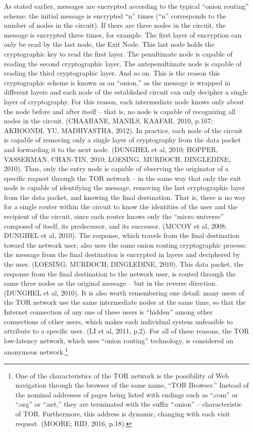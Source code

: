 As stated earlier, messages are encrypted according to the typical ``onion routing'' scheme: the initial message is encrypted ``n'' times (``n'' corresponds to the number of nodes in the circuit). If there are three nodes in the circuit, the message is encrypted three times, for example. The first layer of encryption can only be read by the last node, the Exit Node. This last node holds the cryptographic key to read the first layer. The penultimate node is capable of reading the second cryptographic layer. The antepenultimate node is capable of reading the third cryptographic layer. And so on. This is the reason this cryptographic scheme is known as an ``onion,'' as the message is wrapped in different layers and each node of the established circuit can only decipher a single layer of cryptography. For this reason, each intermediate node knows only about the node before and after itself -- that is, no node is capable of recognizing all nodes in the circuit. (CHAABANE, MANILS, KAAFAR, 2010, p.167; AKHOONDI, YU, MADHYASTHA, 2012). In practice, each node of the circuit is capable of removing only a single layer of cryptography from the data packet and forwarding it to the next node. (DUNGHEL et al, 2010; HOPPER, VASSERMAN, CHAN-TIN, 2010; LOESING, MURDOCH, DINGLEDINE, 2010). Thus, only the entry node is capable of observing the originator of a specific request through the TOR network -- in the same way that only the exit node is capable of identifying the message, removing the last cryptographic layer from the data packet, and knowing the final destination. That is, there is no way for a single router within the circuit to know the identities of the user and the recipient of the circuit, since each router knows only the ``micro universe'' composed of itself, its predecessor, and its successor. (MCCOY et al, 2008; DUNGHEL et al, 2010). The response, which travels from the final destination toward the network user, also uses the same onion routing cryptographic process: the message from the final destination is encrypted in layers and deciphered by the user. (LOESING; MURDOCH; DINGLEDINE, 2010). This data packet, the response from the final destination to the network user, is routed through the same three nodes as the original message -- but in the reverse direction. (DUNGHEL et al, 2010). It is also worth remembering one detail: many users of the TOR network use the same intermediate nodes at the same time, so that the Internet connection of any one of these users is ``hidden'' among other connections of other users, which makes each individual system unfeasible to attribute to a specific user. (LI et al, 2011, p.2). For all of these reasons, the TOR low-latency network, which uses ``onion routing'' technology, is considered an anonymous network.\footnote{One of the characteristics of the TOR network is the possibility of Web navigation through the browser of the same name, ``TOR Browser.'' Instead of the nominal addresses of pages being listed with endings such as ``.com'' or ``.org'' or ``.net,'' they are terminated with the suffix ``.onion'' -- characteristic of TOR. Furthermore, this address is dynamic, changing with each visit request. (MOORE; RID, 2016, p.18).}

